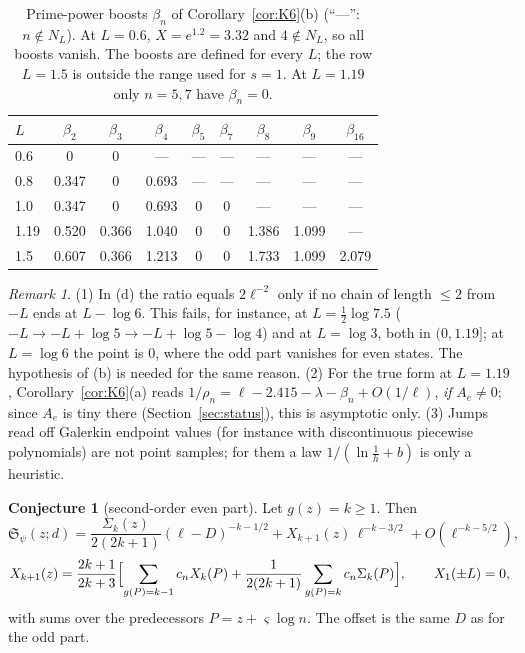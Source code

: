 \documentclass[11pt]{amsart}
\newcommand{\Sj}{\mathfrak{S}}
\theoremstyle{definition}
\newtheorem{conjecture}[theorem]{Conjecture}
\theoremstyle{remark}
\newtheorem{remark}[theorem]{Remark}
\numberwithin{equation}{section}
\begin{document}
\begin{table}[ht]
\centering\small
\caption{Prime-power boosts $\beta_n$ of Corollary~\ref{cor:K6}(b) (``---'': $n\notin N_L$). At $L=0.6$, $X=e^{1.2}=3.32$ and $4\notin N_L$, so all boosts vanish. The boosts are defined for every $L$; the row $L=1.5$ is outside the range used for $s=1$. At $L=1.19$ only $n=5,7$ have $\beta_n=0$.}\label{tab:boosts}
\begin{tabular}{lcccccccc}
\toprule
$L$ & $\beta_2$ & $\beta_3$ & $\beta_4$ & $\beta_5$ & $\beta_7$ & $\beta_8$ & $\beta_9$ & $\beta_{16}$\\
\midrule
0.6 & 0 & 0 & --- & --- & --- & --- & --- & ---\\
0.8 & 0.347 & 0 & 0.693 & --- & --- & --- & --- & ---\\
1.0 & 0.347 & 0 & 0.693 & 0 & 0 & --- & --- & ---\\
1.19 & 0.520 & 0.366 & 1.040 & 0 & 0 & 1.386 & 1.099 & ---\\
1.5 & 0.607 & 0.366 & 1.213 & 0 & 0 & 1.733 & 1.099 & 2.079\\
\bottomrule
\end{tabular}
\end{table}

\begin{remark}\label{rem:K6}
(1) In (d) the ratio equals $2\ell^{-2}$ only if no chain of length $\le2$ from $-L$ ends at $L-\log6$. This fails, for instance, at $L=\frac12\log7.5$ ($-L\to-L+\log5\to-L+\log5-\log4$) and at $L=\log3$, both in $(0,1.19]$; at $L=\log6$ the point is $0$, where the odd part vanishes for even states. The hypothesis of (b) is needed for the same reason. (2) For the true form at $L=1.19$, Corollary~\ref{cor:K6}(a) reads $1/\rho_n=\ell-2.415-\lambda-\beta_n+O(1/\ell)$, \emph{if} $A_e\ne0$; since $A_e$ is tiny there (Section~\ref{sec:status}), this is asymptotic only. (3) Jumps read off Galerkin endpoint values (for instance with discontinuous piecewise polynomials) are not point samples; for them a law $1/(\ln\frac1h+b)$ is only a heuristic.
\end{remark}

\begin{conjecture}[second-order even part]\label{conj:K7}
Let $g(z)=k\ge1$. Then
\[
\Sj_\psi(z;d)=\frac{\Sigma_k(z)}{2(2k+1)}(\ell-D)^{-k-1/2}+X_{k+1}(z)\,\ell^{-k-3/2}+O(\ell^{-k-5/2}),
\]
\[
X_{k+1}(z)=\frac{2k+1}{2k+3}\Bigl[\sum_{g(P)=k-1}c_nX_k(P)+\frac1{2(2k+1)}\sum_{g(P)=k}c_n\Sigma_k(P)\Bigr],\qquad X_1(\pm L)=0,
\]
with sums over the predecessors $P=z+\varsigma\log n$. The offset is the same $D$ as for the odd part.
\end{conjecture}
\end{document}
